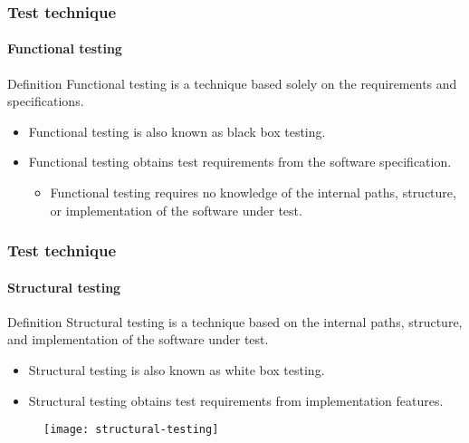 \begin{frame}[imacidii]
\frametitle{Test technique}
\framesubtitle{Functional testing}
\label{concept:functional-testing}

\begin{block:concept}{Definition}
Functional testing is a technique based solely on the requirements and
specifications.
\end{block:concept}

\begin{block:fact}{}
\begin{itemize}
	\item Functional testing is also known as black box testing.

	\item Functional testing obtains test requirements from the
	software specification.
	\begin{itemize}
		\item Functional testing requires no knowledge of the internal paths,
		structure, or implementation of the software under test.
	\end{itemize}
\end{itemize}
\end{block:fact}

\hfill
{}
\end{frame}



\begin{frame}[imacidii]
\frametitle{Test technique}
\framesubtitle{Structural testing}

\begin{block:concept}{Definition}
Structural testing is a technique based on the internal paths, structure,
and implementation of the software under test.
\end{block:concept}


\begin{block:fact}{}
\begin{itemize}
	\item Structural testing is also known as white box testing.

	\item Structural testing obtains test requirements from implementation
	features.
\end{itemize}
\end{block:fact}

\begin{figure}
    \centering
    \texttt{[image: structural-testing]}
\end{figure}
\end{frame}



